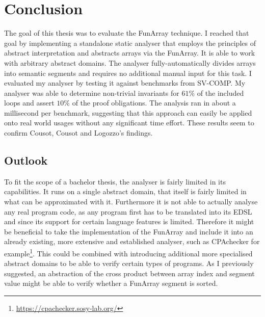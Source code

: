 \chapter{Conclusion}\label{chap:conclusion}

The goal of this thesis was to evaluate the FunArray technique. I reached that goal by implementing a standalone static analyser that employs the principles of abstract interpretation and abstracts arrays via the FunArray. It is able to work with arbitrary abstract domains. The analyser fully-automatically divides arrays into semantic segments and requires no additional manual input for this task.
I evaluated my analyser by testing it against benchmarks from SV-COMP. My analyser was able to determine non-trivial invariants for $61\%$ of the included loops and assert $10\%$ of the proof obligations. The analysis ran in about a millisecond per benchmark, suggesting that this approach can easily be applied onto real world usages without any significant time effort. These results seem to confirm Cousot, Cousot and Logozzo's findings.

\section{Outlook}

To fit the scope of a bachelor thesis, the analyser is fairly limited in its capabilities. It runs on a single abstract domain, that itself is fairly limited in what can be approximated with it. Furthermore it is not able to actually analyse any real program code, as any program first has to be translated into its EDSL and since its support for certain language features is limited. Therefore it might be beneficial to take the implementation of the FunArray and include it into an already existing, more extensive and established analyser, such as CPAchecker for example\footnote{\url{https://cpachecker.sosy-lab.org/}}.
This could be combined with introducing additional more specialised abstract domains to be able to verify certain types of programs. As I previously suggested, an abstraction of the cross product between array index and segment value might be able to verify whether a FunArray segment is sorted.

